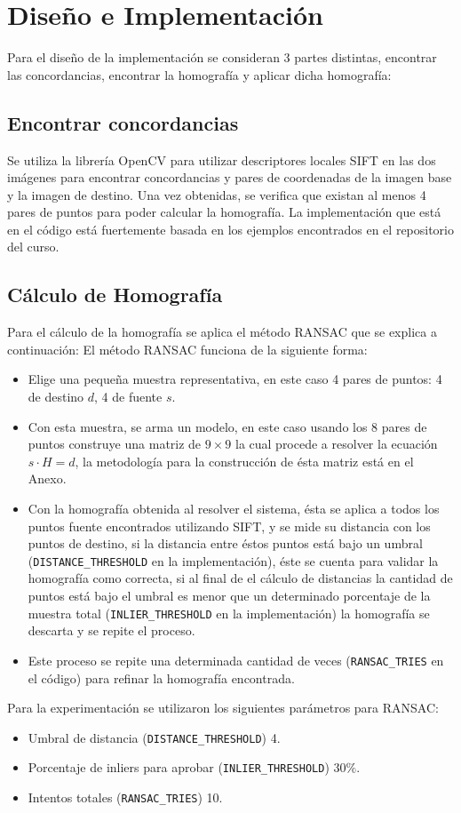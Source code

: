 \documentclass[conference]{IEEEtran}
\begin{document}
\section*{Diseño e Implementación}
	Para el diseño de la implementación se consideran 3 partes distintas, encontrar las concordancias, encontrar la homografía y aplicar dicha homografía:
	\subsection*{Encontrar concordancias}
		Se utiliza la librería OpenCV para utilizar descriptores locales SIFT en las dos imágenes para encontrar concordancias y pares de coordenadas de la imagen base y la imagen de destino. Una vez obtenidas, se verifica que existan al menos 4 pares de puntos para poder calcular la homografía. La implementación que está en el código está fuertemente basada en los ejemplos encontrados en el repositorio del curso.
	\subsection*{Cálculo de Homografía}
		Para el cálculo de la homografía se aplica el método RANSAC que se explica a continuación:
		El método RANSAC funciona de la siguiente forma:
		\begin{itemize}
			\item Elige una pequeña muestra representativa, en este caso 4 pares de puntos: 4 de destino $d$, 4 de fuente $s$.
			\item Con esta muestra, se arma un modelo, en este caso usando los 8 pares de puntos construye una matriz de $9 \times 9$ la cual procede a resolver la ecuación $s  \cdot H = d$, la metodología para la construcción de ésta matriz está en el Anexo.
			\item Con la homografía obtenida al resolver el sistema, ésta se aplica a todos los puntos fuente encontrados utilizando SIFT, y se mide su distancia con los puntos de destino, si la distancia entre éstos puntos está bajo un umbral       (\texttt{DISTANCE\_THRESHOLD} en la implementación), éste se cuenta para validar la homografía como correcta, si al final de el cálculo de distancias la cantidad de puntos está bajo el umbral es menor que un determinado porcentaje de la muestra total (\texttt{INLIER\_THRESHOLD} en la implementación) la homografía se descarta y se repite el proceso.
			\item Este proceso se repite una determinada cantidad de veces (\texttt{RANSAC\_TRIES} en el código) para refinar la homografía encontrada.
		\end{itemize}
		Para la experimentación se utilizaron los siguientes parámetros para RANSAC:
		 \begin{itemize}
		 	\item Umbral de distancia (\texttt{DISTANCE\_THRESHOLD}) 4.
		 	\item Porcentaje de inliers para aprobar (\texttt{INLIER\_THRESHOLD}) $30\%$.
		 	\item Intentos totales (\texttt{RANSAC\_TRIES}) 10.
		 \end{itemize}
\end{document}
